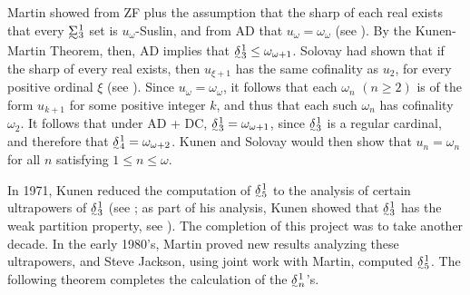\documentclass{book}%
\def\underTilde#1{{\baselineskip=0pt\vtop{\hbox{$#1$}\hbox{$\sim$}}}{}}
\def\undertilde#1{{\baselineskip=0pt\vtop
  {\hbox{$#1$}\hbox{$\scriptscriptstyle\sim$}}}{}}
\newcommand{\uTSigma}{\underTilde{\Sigma}}
\newcommand{\uTDelta}{\underTilde{\Delta}}
\newcommand{\utdelta}{\undertilde{\delta}}
\begin{document}
Martin showed from ZF plus the
assumption that the sharp of each real exists that every
$\uTSigma^{1}_{3}$ set is $u_{\omega}$-Suslin, and from AD that
$u_{\omega} = \omega_{\omega}$ (see \cite[pp.203-204]{Kanamori}). By the Kunen-Martin Theorem, then,
AD implies that
$\utdelta^{1}_{3} \leq \omega_{\omega + 1}$. Solovay had shown that if the sharp of every real exists, then
$u_{\xi + 1}$ has the same cofinality as $u_{2}$, for every positive ordinal $\xi$ (see \cite{Kechris:1978}). Since $u_{\omega} = \omega_{\omega}$, it follows
that each $\omega_{n}$ $(n \geq 2)$ is of the form $u_{k + 1}$ for some positive integer $k$, and thus that each such $\omega_{n}$ has cofinality $\omega_{2}$. It follows that
under AD + DC, $\utdelta^{1}_{3} = \omega_{\omega + 1}$, since $\utdelta^{1}_{3}$ is a regular cardinal, and therefore that $\utdelta^{1}_{4} = \omega_{\omega + 2}$. Kunen and Solovay
would then show that $u_{n} = \omega_{n}$ for all $n$ satisfying $1
\leq n \leq \omega$.











In 1971, Kunen reduced the computation of
$\undertilde{\delta}^{1}_{5}$ to the analysis of certain ultrapowers
of $\undertilde{\delta}^{1}_{3}$ (see \cite{Kechris:1978}; as part of his analysis, Kunen showed that $\utdelta^{1}_{3}$
has the weak partition property, see \cite{Solovay:1978}). The
completion of this project was to take another decade. In the early
1980's, Martin proved new results analyzing these ultrapowers,
and Steve Jackson, using joint work with Martin, computed
$\undertilde{\delta}^{1}_{5}$. The following theorem
\cite{Jackson:1988, Jackson:1999} completes the calculation of the
$\undertilde{\delta}^{1}_{n}$'s.
\end{document}
